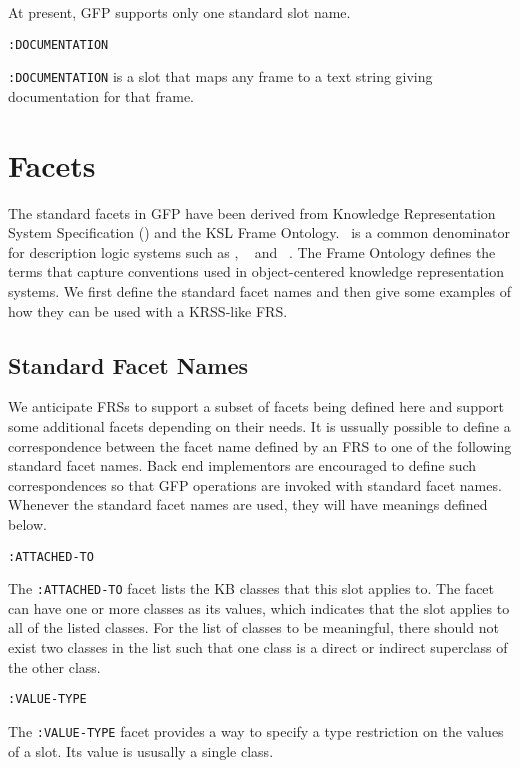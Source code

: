 At present, GFP supports only one standard slot name.

{\tt :DOCUMENTATION}

{\tt :DOCUMENTATION} is a slot that maps any frame to a text string giving
documentation for that frame.

\section{Facets}

\label{sec:std-facets}

The standard facets in GFP have been derived from Knowledge
Representation System Specification (\KRSS)
\cite{KRSS-93} and the KSL Frame Ontology.  \KRSS\ is a common denominator
for description logic systems such as \Loom \cite{LOOM4}, \Classic\
\cite{Borgida-89} and \Back\ \cite{BACK-TR-89}.  The Frame Ontology
defines the terms that capture conventions used in object-centered
knowledge representation systems.  We first define the standard facet
names and then give some examples of how they can be used with a
KRSS-like FRS.

\subsection{Standard Facet Names}

We anticipate FRSs to support a subset of facets being defined here
and support some additional facets depending on their needs. It is
ussually possible to define a correspondence between the facet name
defined by an FRS to one of the following standard facet names.  Back
end implementors are encouraged to define such correspondences so that
GFP operations are invoked with standard facet names.  Whenever the
standard facet names are used, they will have meanings defined below.

{\tt :ATTACHED-TO}

The {\tt :ATTACHED-TO} facet lists the KB classes that this slot applies
to.  The facet can have one or more classes as its values, which
indicates that the slot applies to all of the listed classes.  For the
list of classes to be meaningful, there should not exist two classes
in the list such that one class is a direct or indirect superclass of
the other class.


{\tt :VALUE-TYPE}

The {\tt :VALUE-TYPE} facet provides a way to specify a type
restriction on the values of a slot. Its value is ususally a single
class.

